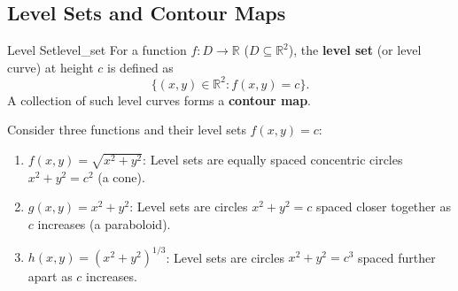\subsection{Level Sets and Contour Maps}

\begin{definition}{Level Set}{level_set}
For a function $f: D \to \mathbb{R}$ ($D \subseteq \mathbb{R}^2$), the \textbf{level set} (or level curve) at height $c$ is defined as
\[
\{(x, y) \in \mathbb{R}^2 : f(x, y) = c\}.
\]
A collection of such level curves forms a \textbf{contour map}.
\end{definition}
\begin{example}
Consider three functions and their level sets $f(x,y) = c$:
\begin{enumerate}
    \item $f(x, y) = \sqrt{x^2 + y^2}$: Level sets are equally spaced concentric circles $x^2 + y^2 = c^2$ (a cone).
    \item $g(x, y) = x^2 + y^2$: Level sets are circles $x^2 + y^2 = c$ spaced closer together as $c$ increases (a paraboloid).
    \item $h(x, y) = (x^2 + y^2)^{1/3}$: Level sets are circles $x^2 + y^2 = c^3$ spaced further apart as $c$ increases.
\end{enumerate}
\end{example}

